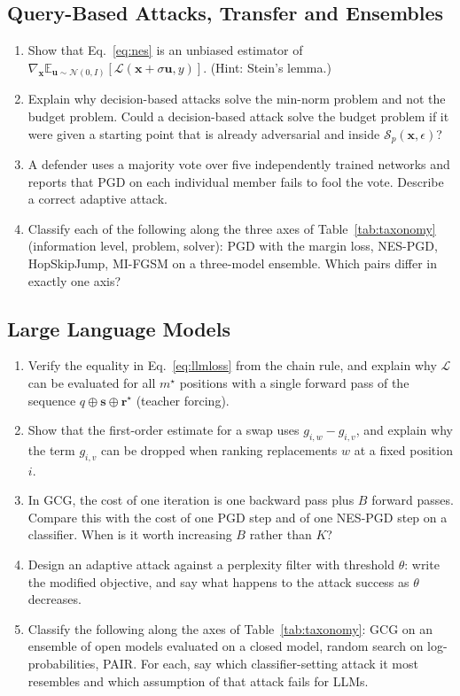 \documentclass[10pt,a4paper]{extarticle}
\theoremstyle{definition}
\newcommand{\Loss}{\mathcal{L}}
\newcommand{\x}{\mathbf{x}}
\begin{document}
\subsection*{Query-Based Attacks, Transfer and Ensembles}

\begin{enumerate}[label=\textbf{\arabic*.},resume]
  \item Show that Eq.~\eqref{eq:nes} is an unbiased estimator of \(\nabla_{\x}\mathbb{E}_{\mathbf{u}\sim\mathcal{N}(0,I)}[\Loss(\x+\sigma\mathbf{u},y)]\). (Hint: Stein's lemma.)
  \item Explain why decision-based attacks solve the min-norm problem and not the budget problem. Could a decision-based attack solve the budget problem if it were given a starting point that is already adversarial and inside \(\mathcal{S}_p(\x,\epsilon)\)?
  \item A defender uses a majority vote over five independently trained networks and reports that PGD on each individual member fails to fool the vote. Describe a correct adaptive attack.
  \item Classify each of the following along the three axes of Table~\ref{tab:taxonomy} (information level, problem, solver): PGD with the margin loss, NES-PGD, HopSkipJump, MI-FGSM on a three-model ensemble. Which pairs differ in exactly one axis?
\end{enumerate}

\subsection*{Large Language Models}

\begin{enumerate}[label=\textbf{\arabic*.},resume]
  \item Verify the equality in Eq.~\eqref{eq:llmloss} from the chain rule, and explain why \(\Loss\) can be evaluated for all \(m^\star\) positions with a single forward pass of the sequence \(q\oplus\mathbf{s}\oplus\mathbf{r}^\star\) (teacher forcing).
  \item Show that the first-order estimate for a swap uses \(g_{i,w}-g_{i,v}\), and explain why the term \(g_{i,v}\) can be dropped when ranking replacements \(w\) at a fixed position \(i\).
  \item In GCG, the cost of one iteration is one backward pass plus \(B\) forward passes. Compare this with the cost of one PGD step and of one NES-PGD step on a classifier. When is it worth increasing \(B\) rather than \(K\)?
  \item Design an adaptive attack against a perplexity filter with threshold \(\theta\): write the modified objective, and say what happens to the attack success as \(\theta\) decreases.
  \item Classify the following along the axes of Table~\ref{tab:taxonomy}: GCG on an ensemble of open models evaluated on a closed model, random search on log-probabilities, PAIR. For each, say which classifier-setting attack it most resembles and which assumption of that attack fails for LLMs.
\end{enumerate}



\end{document}
